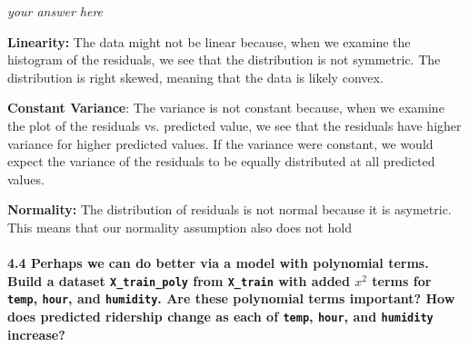 \documentclass[11pt]{article}
\begin{document}
    \emph{your answer here}

\textbf{Linearity:} The data might not be linear because, when we
examine the histogram of the residuals, we see that the distribution is
not symmetric. The distribution is right skewed, meaning that the data
is likely convex.

\textbf{Constant Variance}: The variance is not constant because, when
we examine the plot of the residuals vs. predicted value, we see that
the residuals have higher variance for higher predicted values. If the
variance were constant, we would expect the variance of the residuals to
be equally distributed at all predicted values.

\textbf{Normality:} The distribution of residuals is not normal because
it is asymetric. This means that our normality assumption also does not
hold

    \paragraph{\texorpdfstring{\textbf{4.4} Perhaps we can do better via a
model with polynomial terms. Build a dataset \texttt{X\_train\_poly}
from \texttt{X\_train} with added \(x^2\) terms for \texttt{temp},
\texttt{hour}, and \texttt{humidity}. Are these polynomial terms
important? How does predicted ridership change as each of \texttt{temp},
\texttt{hour}, and \texttt{humidity}
increase?}{4.4 Perhaps we can do better via a model with polynomial terms. Build a dataset X\_train\_poly from X\_train with added x\^{}2 terms for temp, hour, and humidity. Are these polynomial terms important? How does predicted ridership change as each of temp, hour, and humidity increase?}}\label{perhaps-we-can-do-better-via-a-model-with-polynomial-terms.-build-a-dataset-x_train_poly-from-x_train-with-added-x2-terms-for-temp-hour-and-humidity.-are-these-polynomial-terms-important-how-does-predicted-ridership-change-as-each-of-temp-hour-and-humidity-increase}
\end{document}

